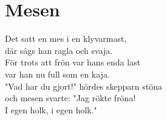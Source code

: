 \section{Mesen}
Det satt en mes i en klyvarmast,\\
där sågs han ragla och svaja.\\
För trots att frön var hans enda last\\
var han nu full som en kaja.\\
"Vad har du gjort!" hördes skepparn stöna\\
och mesen svarte: "Jag rökte fröna!\\
I egen holk, i egen holk."\\